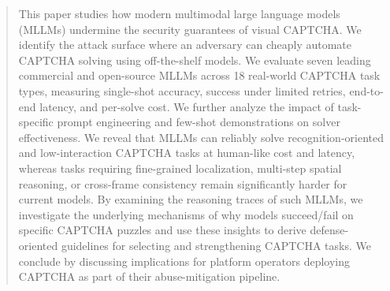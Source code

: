\documentclass[sigconf, review]{acmart}
\begin{document}
\begin{abstract}
  This paper studies how modern multimodal large language models (MLLMs) undermine the security guarantees of visual CAPTCHA. We identify the attack surface where an adversary can cheaply automate CAPTCHA solving using off-the-shelf models. We evaluate seven leading commercial and open-source MLLMs across 18 real-world CAPTCHA task types, measuring single-shot accuracy, success under limited retries, end-to-end latency, and per-solve cost. We further analyze the impact of task-specific prompt engineering and few-shot demonstrations on solver effectiveness. We reveal that MLLMs can reliably solve recognition-oriented and low-interaction CAPTCHA tasks at human-like cost and latency, whereas tasks requiring fine-grained localization, multi-step spatial reasoning, or cross-frame consistency remain significantly harder for current models. By examining the reasoning traces of such MLLMs, we investigate the underlying mechanisms of why models succeed/fail on specific CAPTCHA puzzles and use these insights to derive defense-oriented guidelines for selecting and strengthening CAPTCHA tasks. We conclude by discussing implications for platform operators deploying CAPTCHA as part of their abuse-mitigation pipeline.
  

\end{abstract}

\end{document}

